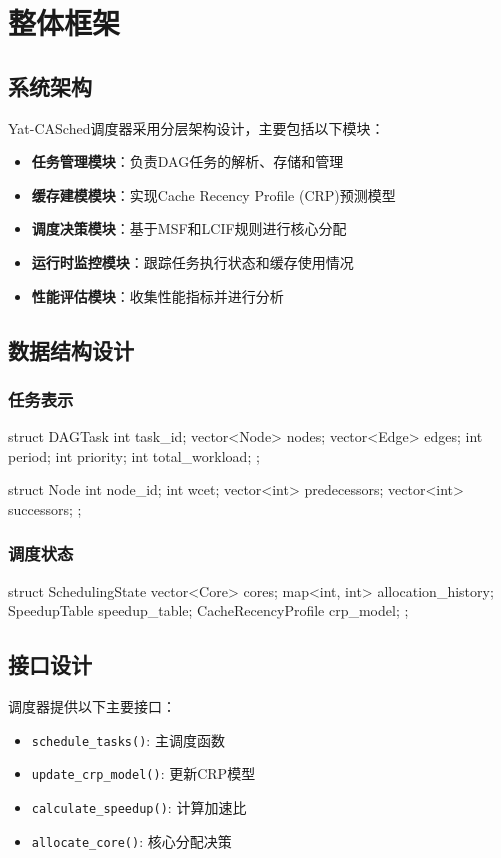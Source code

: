 
\section{整体框架} \label{sec:design}

\subsection{系统架构}

Yat-CASched调度器采用分层架构设计，主要包括以下模块：

\begin{itemize}
    \item \textbf{任务管理模块}：负责DAG任务的解析、存储和管理
    \item \textbf{缓存建模模块}：实现Cache Recency Profile (CRP)预测模型
    \item \textbf{调度决策模块}：基于MSF和LCIF规则进行核心分配
    \item \textbf{运行时监控模块}：跟踪任务执行状态和缓存使用情况
    \item \textbf{性能评估模块}：收集性能指标并进行分析
\end{itemize}

\subsection{数据结构设计}

\subsubsection{任务表示}

\begin{code}
struct DAGTask {
    int task_id;
    vector<Node> nodes;
    vector<Edge> edges;
    int period;
    int priority;
    int total_workload;
};

struct Node {
    int node_id;
    int wcet;
    vector<int> predecessors;
    vector<int> successors;
};
\end{code}

\subsubsection{调度状态}

\begin{code}
struct SchedulingState {
    vector<Core> cores;
    map<int, int> allocation_history;
    SpeedupTable speedup_table;
    CacheRecencyProfile crp_model;
};
\end{code}

\subsection{接口设计}

调度器提供以下主要接口：

\begin{itemize}
    \item \texttt{schedule\_tasks()}: 主调度函数
    \item \texttt{update\_crp\_model()}: 更新CRP模型
    \item \texttt{calculate\_speedup()}: 计算加速比
    \item \texttt{allocate\_core()}: 核心分配决策
\end{itemize}
